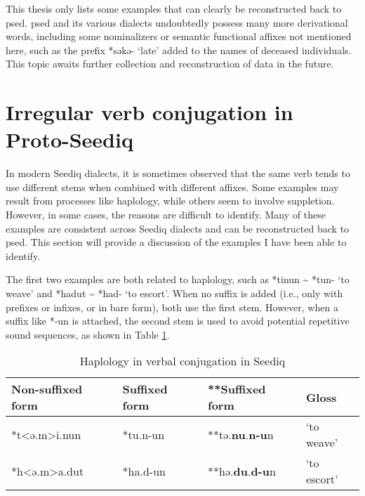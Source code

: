 
This thesis only lists some examples that can clearly be reconstructed back to \acl{psed}. \acl{psed} and its various dialects undoubtedly possess many more derivational words, including some nominalizers or semantic functional affixes not mentioned here, such as the prefix *səkə- `late' added to the names of deceased individuals. This topic awaits further collection and reconstruction of data in the future.

\section{Irregular verb conjugation in Proto-Seediq} \label{sec:psed_irr_v}

In modern Seediq dialects, it is sometimes observed that the same verb tends to use different stems when combined with different affixes. Some examples may result from processes like haplology, while others seem to involve suppletion. However, in some cases, the reasons are difficult to identify. Many of these examples are consistent across Seediq dialects and can be reconstructed back to \acl{psed}. This section will provide a discussion of the examples I have been able to identify.

The first two examples are both related to haplology, such as *tinun \~{} *tun- `to weave' and *hadut \~{} *had- `to escort'. When no suffix is added (i.e., only with prefixes or infixes, or in bare form), both use the first stem. However, when a suffix like *-un is attached, the second stem is used to avoid potential repetitive sound sequences, as shown in Table \ref{tab:psed_hap}.

\begin{table}[!htbp]
\centering
\caption{Haplology in verbal conjugation in Seediq}
\label{tab:psed_hap}
\begin{tabular}{llll}
\hline
Non-suffixed form & Suffixed form & **Suffixed form & Gloss       \\ \hline
*t<ə.m>i.nun        & *tu.n-un       & **tə.\textbf{nu}.\textbf{n-u}n      & `to weave'  \\
*h<ə.m>a.dut        & *ha.d-un       & **hə.\textbf{du}.\textbf{d-u}n      & `to escort' \\ \hline
\end{tabular}
\end{table}

